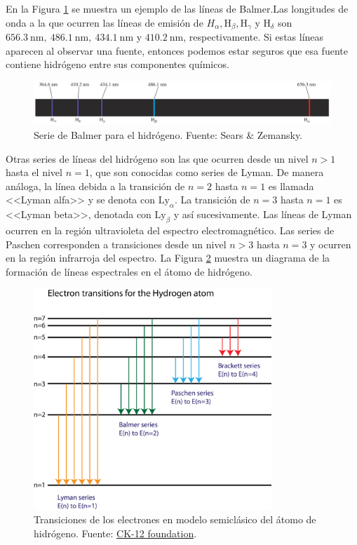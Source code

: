 En la Figura \ref{fig:Balmer-series} se muestra un ejemplo de las líneas de Balmer.Las longitudes de onda a la que ocurren las líneas de emisión de $ H_{\alpha}, \mathrm{H}_{\beta}, \mathrm{H}_{\gamma} $ y $ \mathrm{H}_{\delta} $ son $ \mathrm{656.3 ~ nm, ~ 486.1~ nm, ~ 434.1 ~ nm} $ y $ 410.2 ~\mathrm{nm} $, respectivamente. Si estas líneas aparecen al observar una fuente, entonces podemos estar seguros que esa fuente contiene hidrógeno entre sus componentes químicos. 

\begin{figure}[htb]
  \centering
				\includegraphics[width=\textwidth]{figures/H-spectrum.png}
				\caption{Serie de Balmer para el hidrógeno. Fuente: Sears \& Zemansky.}
				\label{fig:Balmer-series} 
\end{figure}

Otras series de líneas del hidrógeno son las que ocurren desde un nivel $ n >1 $ hasta el nivel $ n=1 $, que son conocidas como series de Lyman. De manera análoga, la línea debida a la transición de $ n=2 $ hasta $ n=1 $ es llamada <<Lyman alfa>> y se denota con $ \mathrm{Ly}_{\alpha} $. La transición de $ n=3 $ hasta $ n=1 $ es <<Lyman beta>>, denotada con $ \mathrm{Ly}_{\beta} $ y así sucesivamente. Las líneas de Lyman ocurren en la región ultravioleta del espectro electromagnético. Las series de Paschen corresponden a transiciones desde un nivel $ n>3 $ hasta $ n=3 $ y ocurren en la región infrarroja del espectro. La Figura \ref{fig:hidrogen-series} muestra un diagrama de la formación de líneas espectrales en el átomo de hidrógeno.

\begin{figure}[htb]
  \centering
				\includegraphics[width=0.8\textwidth]{figures/hydrogen-lines-transitions.png}
				\caption{Transiciones de los electrones en modelo semiclásico del átomo de hidrógeno. Fuente: \href{https://www.ck12.org/book/cbse_physics_book_class_xii/section/12.14/}{CK-12 foundation}.}
				\label{fig:hidrogen-series} 
\end{figure}

